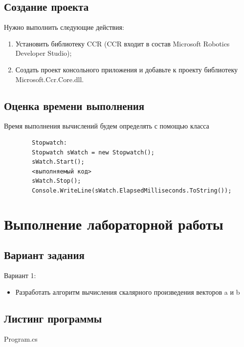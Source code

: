 \documentclass[russian,utf8,pointsection]{eskdtext}
\begin{document}
       \subsection{Создание проекта}
       Нужно выполнить следующие действия:
       \begin{enumerate}
       \item Установить библиотеку CCR (CCR входит в состав Microsoft Robotics Developer Studio);
       \item Создать проект консольного приложения и добавьте к проекту библиотеку Microsoft.Ccr.Core.dll.
       	\end{enumerate}
       	
       	\subsection{Оценка времени выполнения}
       	Время выполнения вычислений будем определять с помощью класса
       	\begin{lstlisting}
       	Stopwatch:       	
       	Stopwatch sWatch = new Stopwatch();       	
       	sWatch.Start();       	
       	<выполняемый код>       	
       	sWatch.Stop();       	
       	Console.WriteLine(sWatch.ElapsedMilliseconds.ToString());
       	      	\end{lstlisting}
       	
       	\section{Выполнение лабораторной работы}
       		\subsection{Вариант задания}
       		Вариант 1:
       		\begin{itemize}
       			\item Разработать алгоритм вычисления скалярного произведения векторов a и b
       		\end{itemize}
       	\subsection{Листинг программы}
       
     
  
   {Program.cs}
       	
\end{document}
